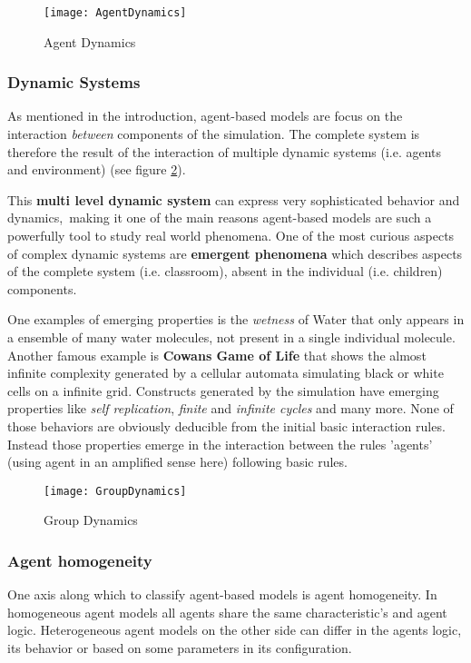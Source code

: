 \begin{figure}[]
    \centering
    \texttt{[image: AgentDynamics]} 
    \caption{Agent Dynamics}
    \label{AgentDynamics}
\end{figure}

\subsubsection{Dynamic Systems}
As mentioned in the introduction, agent-based models are focus on the interaction
\textit{between} components of the simulation. The complete system is therefore
the result of the interaction of multiple dynamic systems (i.e. agents and environment)
(see figure \ref{GroupDynamics}). 

\bb

This \textbf{multi level dynamic system} can express very sophisticated behavior and dynamics,\
making it one of the main reasons agent-based models are such a powerfully tool to study
real world phenomena. One of the most curious aspects of complex dynamic systems
are \textbf{emergent phenomena}\cite{Corning2002} which describes aspects of the
complete system (i.e. classroom), absent in the individual (i.e. children) components.

\bb

One examples of emerging properties is the \textit{wetness} of Water that only appears in a
ensemble of many water molecules, not present in a single individual molecule. 
Another famous example is \textbf{Cowans Game of Life}\cite{Adamatzky2010}
that shows the almost infinite complexity generated by a cellular automata simulating
black or white cells on a infinite grid. Constructs generated by the simulation
have emerging properties like \textit{self replication}, \textit{finite} and
\textit{infinite cycles} and many more. None of those behaviors are obviously deducible
from the initial basic interaction rules. Instead those properties emerge in the
interaction between the rules 'agents' (using agent in an amplified sense here)
following basic rules.

\begin{figure}[]
    \centering
    \texttt{[image: GroupDynamics]} 
    \caption{Group Dynamics}
    \label{GroupDynamics}
\end{figure}

\subsubsection{Agent homogeneity}
One axis along which to classify agent-based models is agent homogeneity\cite{Pudane2017}.
In homogeneous agent models all agents share the same characteristic's and agent logic.
Heterogeneous agent models on the other side can differ in the agents logic, its behavior
or based on some parameters in its configuration.

